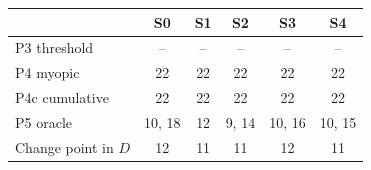 \begin{tabular}{@{}lccccc@{}}
\toprule
 & S0 & S1 & S2 & S3 & S4 \\
\midrule
P3 threshold & -- & -- & -- & -- & -- \\
P4 myopic & 22 & 22 & 22 & 22 & 22 \\
P4c cumulative & 22 & 22 & 22 & 22 & 22 \\
P5 oracle & 10, 18 & 12 & 9, 14 & 10, 16 & 10, 15 \\
\midrule
Change point in $D$ & 12 & 11 & 11 & 12 & 11 \\
\bottomrule
\end{tabular}
